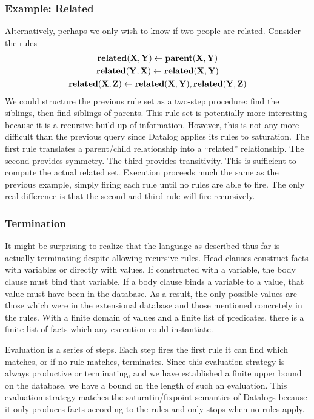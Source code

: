 \subsubsection{Example: Related}
Alternatively, perhaps we only wish to know if two people are related.
Consider the rules
\begin{gather*}
        {\bf related}({\bf X}, {\bf Y}) \leftarrow {\bf parent}({\bf X}, {\bf Y})\\
        {\bf related}({\bf Y}, {\bf X}) \leftarrow {\bf related}({\bf X}, {\bf Y})\\
        {\bf related}({\bf X}, {\bf Z}) \leftarrow {\bf related}({\bf X}, {\bf Y}), {\bf related}({\bf Y}, {\bf Z})
\end{gather*}
We could structure the previous rule set as a two-step procedure: find the siblings, then find siblings of parents.
This rule set is potentially more interesting because it is a recursive build up of information.
However, this is not any more difficult than the previous query since Datalog applies its rules to saturation.
The first rule translates a parent/child relationship into a ``related'' relationship.
The second provides symmetry.
The third provides transitivity.
This is sufficient to compute the actual related set.
Execution proceeds much the same as the previous example, simply firing each rule until no rules are able to fire.
The only real difference is that the second and third rule will fire recursively.
\subsubsection{Termination}
It might be surprising to realize that the language as described thus far is actually terminating despite allowing recursive rules.
Head clauses construct facts with variables or directly with values.
If constructed with a variable, the body clause must bind that variable.
If a body clause binds a variable to a value, that value must have been in the database.
As a result, the only possible values are those which were in the extensional database and those mentioned concretely in the rules.
With a finite domain of values and a finite list of predicates, there is a finite list of facts which any execution could instantiate.

Evaluation is a series of steps.
Each step fires the first rule it can find which matches, or if no rule matches, terminates.
Since this evaluation strategy is always productive or terminating, and we have established a finite upper bound on the database, we have a bound on the length of such an evaluation.
This evaluation strategy matches the saturatin/fixpoint semantics of Datalogs because it only produces facts according to the rules and only stops when no rules apply.

